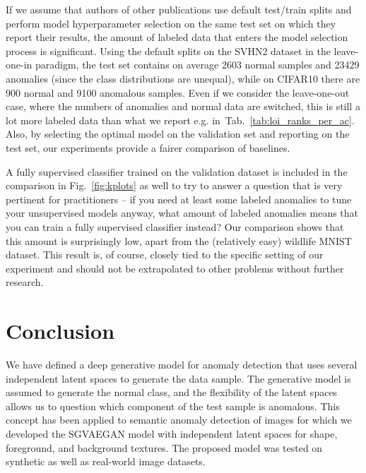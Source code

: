 

If we assume that authors of other publications use default test/train splits and perform model hyperparameter selection on the same test set on which they report their results, the amount of labeled data that enters the model selection process is significant. Using the default splits on the SVHN2 dataset in the leave-one-in paradigm, the test set contains on average 2603 normal samples and 23429 anomalies (since the class distributions are unequal), while on CIFAR10 there are 900 normal and 9100 anomalous samples. Even if we consider the leave-one-out case, where the numbers of anomalies and normal data are switched, this is still a lot more labeled data than what we report e.g. in~Tab.~\ref{tab:loi_ranks_per_ac}. Also, by selecting the optimal model on the validation set and reporting on the test set, our experiments provide a fairer comparison of baselines.

A fully supervised classifier trained on the validation dataset is included in the comparison in Fig.~\ref{fig:kplots} as well to try to answer a question that is very pertinent for practitioners -- if you need at least some labeled anomalies to tune your unsupervised models anyway, what amount of labeled anomalies means that you can train a fully supervised classifier instead? Our comparison shows that this amount is surprisingly low, apart from the (relatively easy) wildlife MNIST dataset. This result is, of course, closely tied to the specific setting of our experiment and should not be extrapolated to other problems without further research.


\section{Conclusion}
We have defined a deep generative model for anomaly detection that uses several independent latent spaces to generate the data sample. The generative model is assumed to generate the normal class, and the flexibility of the latent spaces allows us to question which component of the test sample is anomalous. This concept has been applied to semantic anomaly detection of images for which we developed the SGVAEGAN model with independent latent spaces for shape, foreground, and background textures. The proposed model was tested on synthetic as well as real-world image datasets.

